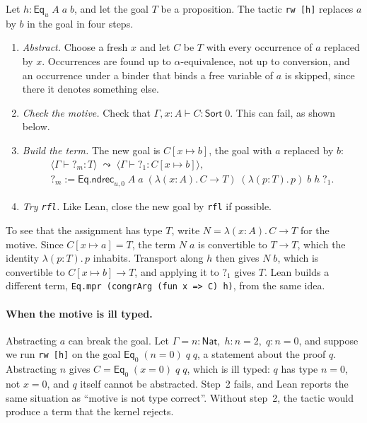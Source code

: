 \documentclass[acmsmall,screen,nonacm]{acmart}
\newcommand{\Sort}[1]{\mathsf{Sort}\;#1}
\newcommand{\tLam}[3]{\lambda(#1{:}#2).\,#3}
\newcommand{\subst}[3]{#1[#2 \mapsto #3]}
\newcommand{\Nat}{\mathsf{Nat}}
\newcommand{\Eq}[1]{\mathsf{Eq}_{#1}}
\newcommand{\EqRec}[1]{\mathsf{Eq.ndrec}_{#1}}
\newcommand{\hole}[1]{?_{#1}}
\begin{document}
Let $h : \Eq{u}\;A\;a\;b$, and let the goal $T$ be a proposition.
The tactic \texttt{rw [h]} replaces $a$ by $b$ in the goal in four steps.
\begin{enumerate}
  \item \emph{Abstract.} Choose a fresh $x$ and let $C$ be $T$ with every occurrence of $a$ replaced by $x$.
    Occurrences are found up to $\alpha$-equivalence, not up to conversion,
    and an occurrence under a binder that binds a free variable of $a$ is skipped, since there it denotes something else.
  \item \emph{Check the motive.} Check that $\Gamma, x : A \vdash C : \Sort{0}$. This can fail, as shown below.
  \item \emph{Build the term.} The new goal is $\subst{C}{x}{b}$, the goal with $a$ replaced by $b$:
    \[
    \begin{array}{l}
    \langle \Gamma \vdash \hole{m} : T \rangle \;\leadsto\; \langle \Gamma \vdash \hole{1} : \subst{C}{x}{b} \rangle, \\[4pt]
    \hole{m} \mathrel{:=} \EqRec{u,0}\;A\;a\;(\tLam{x}{A}{C \to T})\;(\tLam{p}{T}{p})\;b\;h\;\hole{1}.
    \end{array}
    \]
  \item \emph{Try \texttt{rfl}.} Like Lean, close the new goal by \texttt{rfl} if possible.
\end{enumerate}
To see that the assignment has type $T$, write $N = \tLam{x}{A}{C \to T}$ for the motive.
Since $\subst{C}{x}{a} = T$, the term $N\;a$ is convertible to $T \to T$, which the identity $\tLam{p}{T}{p}$ inhabits.
Transport along $h$ then gives $N\;b$, which is convertible to $\subst{C}{x}{b} \to T$, and applying it to $\hole{1}$ gives $T$.
Lean builds a different term, \texttt{Eq.mpr (congrArg (fun x => C) h)}, from the same idea.

\paragraph{When the motive is ill typed.}
Abstracting $a$ can break the goal.
Let $\Gamma = n : \Nat,\; h : n = 2,\; q : n = 0$, and suppose we run \texttt{rw [h]} on the goal $\Eq{0}\;(n = 0)\;q\;q$, a statement about the proof $q$.
Abstracting $n$ gives $C = \Eq{0}\;(x = 0)\;q\;q$, which is ill typed: $q$ has type $n = 0$, not $x = 0$, and $q$ itself cannot be abstracted.
Step~2 fails, and Lean reports the same situation as ``motive is not type correct''.
Without step~2, the tactic would produce a term that the kernel rejects.
\end{document}
